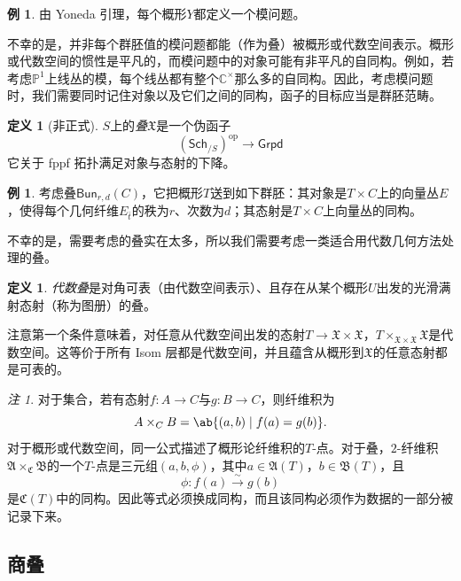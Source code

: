 \documentclass{amsart}
\theoremstyle{definition}
\newtheorem{defn}[thm]{定义}
\newtheorem{exm}[thm]{例}
\theoremstyle{remark}
\newtheorem{rmk}[thm]{注}
\theoremstyle{plain}
\theoremstyle{definition}
\theoremstyle{remark}
\newcommand{\C}{\mathbb{C}}
\renewcommand{\P}{\mathbb{P}}
\newcommand{\mf}[1]{\mathfrak{#1}}
\newcommand{\mr}[1]{\mathrm{#1}}
\newcommand{\ms}[1]{\mathsf{#1}}
\newcommand{\1}{\mathbf{1}}
\newcommand{\2}{\mathbf{2}}
\newcommand{\3}{\mathbf{3}}
\begin{document}
\begin{exm}
    由 Yoneda 引理，每个概形\(Y\)都定义一个模问题。
\end{exm}

不幸的是，并非每个群胚值的模问题都能（作为叠）被概形或代数空间表示。概形或代数空间的惯性是平凡的，而模问题中的对象可能有非平凡的自同构。例如，若考虑\(\P^1\)上线丛的模，每个线丛都有整个\(\C^{\times}\)那么多的自同构。因此，考虑模问题时，我们需要同时记住对象以及它们之间的同构，函子的目标应当是群胚范畴。

\begin{defn}[非正式]
    \(S\)上的\textit{叠}\(\mf{X}\)是一个伪函子
    \[ (\ms{Sch}_{/S})^{\mr{op}} \to \ms{Grpd} \]
    它关于 fppf 拓扑满足对象与态射的下降。
\end{defn}

\begin{exm}
    考虑叠\(\ms{Bun}_{r,d}(C)\)，它把概形\(T\)送到如下群胚：其对象是\(T\times C\)上的向量丛\(E\)，使得每个几何纤维\(E_{\bar t}\)的秩为\(r\)、次数为\(d\)；其态射是\(T\times C\)上向量丛的同构。
\end{exm}

不幸的是，需要考虑的叠实在太多，所以我们需要考虑一类适合用代数几何方法处理的叠。

\begin{defn}
    \textit{代数叠}是对角可表（由代数空间表示）、且存在从某个概形\(U\)出发的光滑满射态射（称为图册）的叠。
\end{defn}

注意第一个条件意味着，对任意从代数空间出发的态射\(T \to \mf{X} \times \mf{X}\)，\(T \times_{\mf{X} \times \mf{X}} \mf{X}\)是代数空间。这等价于所有 Isom 层都是代数空间，并且蕴含从概形到\(\mf{X}\)的任意态射都是可表的。

\begin{rmk}
    对于集合，若有态射\(f\colon A\to C\)与\(g\colon B\to C\)，则纤维积为
    \[
        A\times_C B=\ab\{(a,b)\mid f(a)=g(b)\}.
    \]
    对于概形或代数空间，同一公式描述了概形论纤维积的\(T\)-点。对于叠，\(2\)-纤维积\(\mf{A}\times_{\mf{C}}\mf{B}\)的一个\(T\)-点是三元组\((a,b,\phi)\)，其中\(a\in\mf{A}(T)\)，\(b\in\mf{B}(T)\)，且
    \[
        \phi\colon f(a)\xrightarrow{\sim}g(b)
    \]
    是\(\mf{C}(T)\)中的同构。因此等式必须换成同构，而且该同构必须作为数据的一部分被记录下来。
\end{rmk}


\subsection{商叠}%
\label{sub:Quotient stacks}
\end{document}
